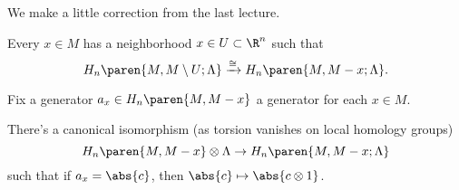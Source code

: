 We make a little correction from the last lecture.

\begin{lem}
    \label{lem:local_homology}
    Every $x \in M$ has  a neighborhood $x \in U \subset \R^n$ such that 
    \begin{equation*}
        {H}_{n}\paren{M, M\setminus U; \Lambda} \xrightarrow{\cong} {H}_{n}\paren{M, M- x; \Lambda}.
    \end{equation*}
\end{lem}

Fix a generator $a_x \in {H}_{n}\paren{M, M - x}$ a generator for each $x \in M$.

\begin{rem}
    \label{rem:tensorcanon}
    There's  a canonical isomorphism  (as torsion vanishes on local homology groups)
    \begin{equation*}
        {H}_{n}\paren{M, M - x} \otimes \Lambda \to
        {H}_{n}\paren{M, M - x; \Lambda}
    \end{equation*}
    such that if $a_x = \abs{c}$, then  $\abs{c} \mapsto \abs{c \otimes 1}$.
\end{rem}
